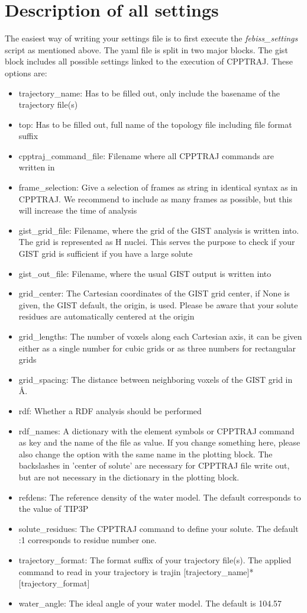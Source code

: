 \documentclass[12pt]{scrartcl} %
\begin{document}
\section{Description of all settings}
The easiest way of writing your settings file is to first execute the \textit{febiss\_settings} script as mentioned above. The yaml file is split in two major blocks. The gist block includes all possible settings linked to the execution of CPPTRAJ. These options are:
\begin{itemize}
	\item trajectory\_name: Has to be filled out, only include the basename of the trajectory file(s)
	\item top: Has to be filled out, full name of the topology file including file format suffix
	\item cpptraj\_command\_file: Filename where all CPPTRAJ commands are written in
	\item frame\_selection: Give a selection of frames as string in identical syntax as in CPPTRAJ. We recommend to include as many frames as possible, but this will increase the time of analysis
	\item gist\_grid\_file: Filename, where the grid of the GIST analysis is written into. The grid is represented as H nuclei. This serves the purpose to check if your GIST grid is sufficient if you have a large solute
	\item gist\_out\_file: Filename, where the usual GIST output is written into
	\item grid\_center: The Cartesian coordinates of the GIST grid center, if None is given, the GIST default, the origin, is used. Please be aware that your solute residues are automatically centered at the origin
	\item grid\_lengths: The number of voxels along each Cartesian axis, it can be given either as a single number for cubic grids or as three numbers for rectangular grids
	\item grid\_spacing: The distance between neighboring voxels of the GIST grid in \si{\angstrom}.
	\item rdf: Whether a RDF analysis should be performed
	\item rdf\_names: A dictionary with the element symbols or CPPTRAJ command as key and the name of the file as value. If you change something here, please also change the option with the same name in the plotting block. The backslashes in 'center of solute' are necessary for CPPTRAJ file write out, but are not necessary in the dictionary in the plotting block.
	\item refdens: The reference density of the water model. The default corresponds to the value of TIP3P
	\item solute\_residues: The CPPTRAJ command to define your solute. The default :1 corresponds to residue number one.
	\item trajectory\_format: The format suffix of your trajectory file(s). The applied command to read in your trajectory is trajin [trajectory\_name]*[trajectory\_format]
	\item water\_angle: The ideal angle of your water model. The default is 104.57
\end{itemize}
\end{document}
